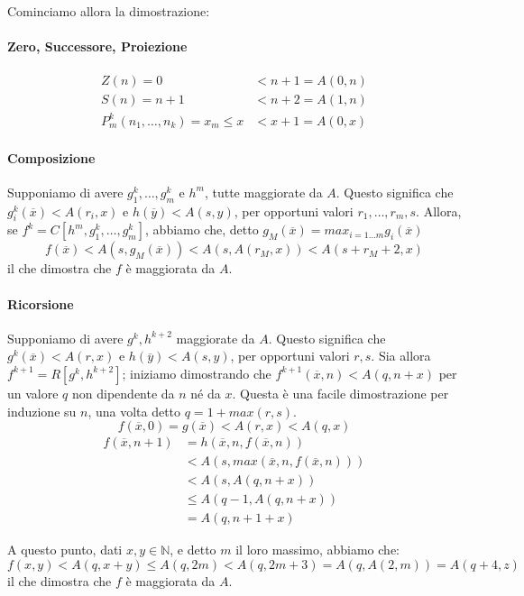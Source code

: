 \documentclass[a4paper,10pt]{article}
\begin{document}
Cominciamo allora la dimostrazione:

\paragraph{Zero, Successore, Proiezione} 
\begin{align*}
  Z(n) = 0 &< n+1 = A(0,n) \\
  S(n) = n+1 &< n+2 = A(1,n) \\
  P^k_m(n_1,\dots ,n_k) = x_m \leq x &< x+1 = A(0,x)
\end{align*}

\paragraph{Composizione}
Supponiamo di avere $g^k_1,\dots,g^k_m$ e $h^m$, tutte maggiorate da $A$.
Questo significa che $g^k_i(\overline{x}) < A(r_i, x)$ e $h(\overline{y}) < A(s, y)$, per opportuni valori $r_1,\dots,r_m,s$.
Allora, se $f^k = C[h^m,g^k_1,\dots,g^k_m]$, abbiamo che, detto $g_M(\overline{x}) = max_{i=1\dots m} g_i(\overline{x})$
$$f(\overline{x}) < A(s,g_M(\overline{x})) < A(s,A(r_M,x)) < A(s+r_M+2,x)$$
il che dimostra che $f$ è maggiorata da $A$.

\paragraph{Ricorsione}
Supponiamo di avere $g^k,h^{k+2}$ maggiorate da $A$.
Questo significa che $g^k(\overline{x}) < A(r, x)$ e $h(\overline{y}) < A(s, y)$, per opportuni valori $r,s$.
Sia allora $f^{k+1} = R[g^k,h^{k+2}]$; iniziamo dimostrando che $f^{k+1}(\overline{x}, n) < A(q,n+x)$ per un valore $q$ non dipendente da $n$ né da $x$.
Questa è una facile dimostrazione per induzione su $n$, una volta detto $q=1+max(r,s)$.
$$f(\overline{x}, 0) = g(\overline{x}) < A(r,x) < A(q,x)$$
\begin{align*}
  f(\overline{x}, n+1) &= h(\overline{x}, n, f(\overline{x},n)) \\
                       &< A(s,max(\overline{x}, n, f(\overline{x},n))) \\
                       &< A(s, A(q,n+x)) \\
                       & \leq A(q-1, A(q,n+x)) \\
                       &= A(q,n+1+x)
\end{align*}

A questo punto, dati $x,y\in \mathbb{N}$, e detto $m$ il loro massimo, abbiamo che:
$$f(x,y) < A(q,x+y) \leq A(q,2m) < A(q,2m+3) = A(q,A(2,m)) = A(q+4,z)$$
il che dimostra che $f$ è maggiorata da $A$.
\end{document}

